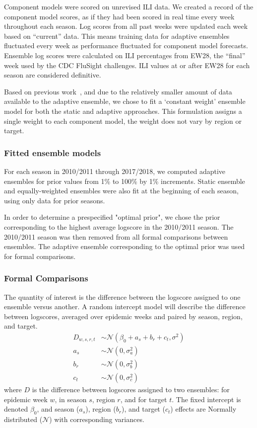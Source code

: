 \documentclass[12pt]{article}
\def\l{\left}
\def\r{\right}
\begin{document}
Component models were scored on unrevised ILI data.
We created a record of the component model scores, as if they had been scored in real time every week throughout each season.
Log scores from all past weeks were updated each week based on ``current'' data.
This means training data for adaptive ensembles fluctuated every week as performance fluctuated for component model forecasts.
Ensemble log scores were calculated on ILI percentages from EW28, the ``final'' week used by the CDC FluSight challenges.
ILI values at or after EW28 for each season are considered definitive.

Based on previous work~\cite{reich2019collaborativepnas}, and due to the relatively smaller amount of data available to the adaptive ensemble, we chose to fit a  `constant weight' ensemble model for both the static and adaptive approaches. This formulation assigns a single weight to each component model, the weight does not vary by region or target.


\subsubsection{Fitted ensemble models}

For each season in 2010/2011 through 2017/2018, we computed adaptive ensembles for prior values from 1\% to 100\% by 1\% increments. 
Static ensemble and equally-weighted ensembles were also fit at the beginning of each season, using only data for prior seasons.

In order to determine a prespecified "optimal prior", we chose the prior corresponding to the highest average logscore in the 2010/2011 season.
The 2010/2011 season was then removed from all formal comparisons between ensembles.
The adaptive ensemble corresponding to the optimal prior was used for formal comparisons.

\subsubsection{Formal Comparisons}

The quantity of interest is the difference between the logscore assigned to one ensemble versus another.
A random intercept model will describe the difference between logscores, averaged over epidemic weeks and paired by season, region, and target.
\begin{align}
    D_{w,s,r,t} &\sim \mathcal{N}\l( \beta_{0} + a_{s} + b_{r} + c_{t}, \sigma^{2} \r)\\
    a_{s} &\sim \mathcal{N}\l(0,\sigma^{2}_{a}\r) \nonumber \\
    b_{r} &\sim \mathcal{N}\l(0,\sigma^{2}_{b}\r) \nonumber \\
    c_{t} &\sim \mathcal{N}\l(0,\sigma^{2}_{c}\r) \nonumber
\end{align}
where $D$ is the difference between logscores assigned to two ensembles: for epidemic week $w$, in season $s$, region $r$, and for target $t$. 
The fixed intercept is denoted $\beta_{0}$, and season ($a_{s}$), region ($b_{r}$), and target ($c_{t}$) effects are Normally distributed ($\mathcal{N}$) with corresponding variances.
\end{document}

